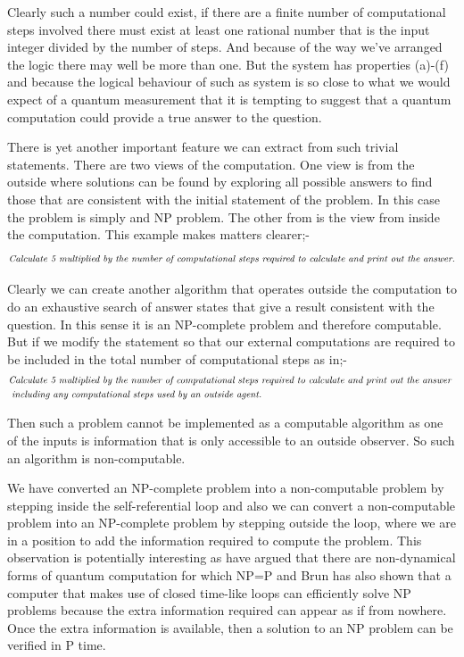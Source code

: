 \documentclass[
   ,final            %
  ]
  {aipproc}
\begin{document}
\par
Clearly such a number could exist, if there are a finite number of computational steps involved there must
exist at least one rational number that is the input integer divided by the number of steps. And because of
the way we've arranged the logic there may well be more than one. But the system has properties (a)-(f) and
because the logical behaviour of such as system is so close to what we would expect of a quantum measurement
that it is tempting to suggest that a quantum computation could provide a true answer to the question.
\par
There is yet another important feature we can extract from such trivial statements. There are two views
of the computation. One view is from the outside where solutions can be found by exploring all possible
answers to find those that are consistent with the initial statement of the problem. In this case the problem
is simply and NP problem. The other from is the view from inside the computation. This example makes
matters clearer;-
\begin{equation}
\text{\emph{Calculate 5 multiplied by the number of computational steps required to calculate and print out the answer.}}
\end{equation}
\par
Clearly we can create another algorithm that operates outside the computation to do an exhaustive search
of answer states that give a result consistent with the question. In this sense it is an NP-complete problem
and therefore computable. But if we modify the statement so that our external computations are required
to be included in the total number of computational steps as in;-
\begin{equation}
\begin{aligned}
&\text{\emph{Calculate 5 multiplied by the number of computational steps required to calculate and print out the answer }}\\
&\text{ \emph{including any computational steps used by an outside agent.}}
\end{aligned}
\end{equation}
\par
Then such a problem cannot be implemented as a computable algorithm as one of the inputs is information
that is only accessible to an outside observer. So such an algorithm is non-computable.
\par
We have converted an NP-complete problem into a non-computable problem by stepping inside the
self-referential loop and also we can convert a non-computable problem into an NP-complete problem
by stepping outside the loop, where we are in a position to add the information required to compute the
problem. This observation is potentially interesting as \citet*{Castagnoli_Finkelstein_2002_09_084} have argued that
there are non-dynamical forms of quantum computation for which NP=P and Brun \citep{Brun_ctc} has also
shown that a computer that makes use of closed time-like loops can efficiently solve NP problems because
the extra information required can appear as if from nowhere. Once the extra information is available, then
a solution to an NP problem can be verified in P time.
\end{document}
